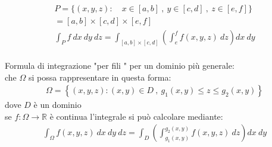 \documentclass[a4paper, oneside]{article}
\begin{document}
\begin{proposition}
  \begin{gather*}
    P=\{ (x,y,z): \quad x\in[a,b] \ , \ y \in[c,d] \ , \ z \in[e,f] \}\\
    = [a,b] \times [c,d] \times [e,f]\\
    \int_P f \ dx \ dy \ dz = \int_ {[a,b] \times [c,d]} \left( \int_e^f f(x,y,z) \ dz \right) dx \ dy\\
  \end{gather*}
\end{proposition}
\begin{proposition}
  Formula di integrazione "per fili " per un dominio più generale:\\
   che $\Omega$ si possa rappresentare in questa forma:
  \begin{gather*}
    \Omega = \left\{ (x,y,z) : (x,y) \in D \ , \ g_1(x,y) \leq z \leq g_2(x,y) \right\} 
  \end{gather*}
  dove $D$ è un dominio\\
   se $f:\Omega \to \mathbb{R}$ è continua l'integrale si può calcolare mediante:
  \begin{gather*}
    \int_\Omega f(x,y,z) \ dx \ dy \ dz = \int_D \left( \int_{g_1(x,y)}^{g_2(x,y)} f(x,y,z) \ dz \right) dx \ dy
  \end{gather*}
\end{proposition}
\end{document}
